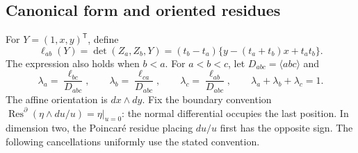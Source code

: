 \subsection{Canonical form and oriented residues}

For \(Y=(1,x,y)^\mathsf T\), define
\begin{equation}
 \ell_{ab}(Y)=\det(Z_a,Z_b,Y)
 =(t_b-t_a)\{y-(t_a+t_b)x+t_at_b\}.
 \label{eq:polygon-lines}
\end{equation}
The expression also holds when \(b<a\). For \(a<b<c\), let
\(D_{abc}=\langle abc\rangle\) and
\begin{equation}
 \lambda_a=\frac{\ell_{bc}}{D_{abc}},\qquad
 \lambda_b=\frac{\ell_{ca}}{D_{abc}},\qquad
 \lambda_c=\frac{\ell_{ab}}{D_{abc}},\qquad
 \lambda_a+\lambda_b+\lambda_c=1.
 \label{eq:polygon-barycentric}
\end{equation}
The affine orientation is \(dx\wedge dy\). Fix the boundary convention
\(\operatorname{Res}^{\partial}(\eta\wedge du/u)=\eta|_{u=0}\):
the normal differential occupies the last position. In dimension two,
the Poincaré residue placing \(du/u\) first has the opposite sign.
The following cancellations uniformly use the stated convention.

